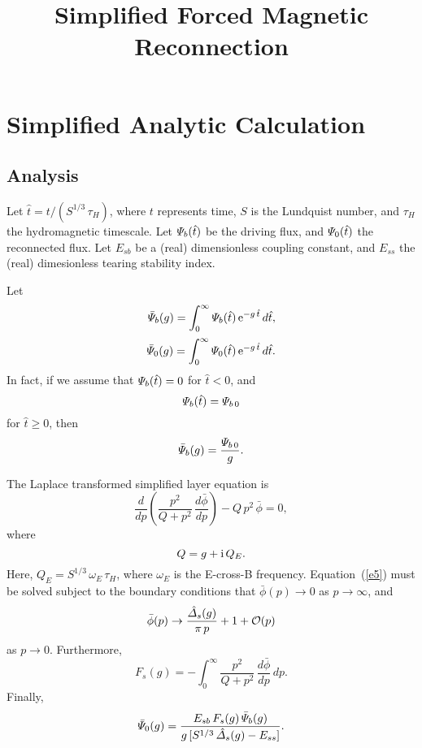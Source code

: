 \documentclass[titlepage=false,12pt]{article}
\begin{document}
\title{Simplified Forced Magnetic Reconnection}
\date{}
\maketitle

\section{Simplified Analytic Calculation}
\subsection{Analysis}
Let $\hat{t}= t/(S^{1/3}\,\tau_H)$, where $t$ represents time, $S$ is the Lundquist number, and $\tau_H$
the hydromagnetic timescale. Let ${\mit\Psi}_b(\hat{t})$ be the driving flux, and ${\mit\Psi}_0(\hat{t})$ the
reconnected flux. Let $E_{sb}$ be a (real) dimensionless coupling constant, and $E_{ss}$ the  (real) dimesionless
tearing stability index.

Let
\begin{align}
\bar{\mit\Psi}_b(g) = \int_0^\infty {\mit\Psi}_b(\hat{t})\,{\rm e}^{-g\,\hat{t}}\,d\hat{t},\\[0.5ex]
\bar{\mit\Psi}_0(g) = \int_0^\infty {\mit\Psi}_0(\hat{t})\,{\rm e}^{-g\,\hat{t}}\,d\hat{t}.
\end{align}
In fact, if we assume that ${\mit\Psi}_b(\hat{t})=0$ for $\hat{t}<0$, and
\begin{equation}
{\mit\Psi}_b(\hat{t}) = {\mit\Psi}_{b\,0}
\end{equation}
for $\hat{t}\geq 0$, then 
\begin{equation}
\bar{\mit\Psi}_b(g) = \frac{{\mit\Psi}_{b\,0}}{g}.
\end{equation}

The Laplace transformed simplified layer equation is
\begin{equation}\label{e5}
\frac{d}{dp}\!\left(\frac{p^2}{Q+p^2}\,\frac{d\bar{\phi}}{dp}\right) - Q\,p^2\,\bar{\phi}=0,
\end{equation}
where
\begin{equation}
Q = g+ {\rm i}\,Q_E.
\end{equation}
Here, $Q_E=S^{1/3}\,\omega_E\,\tau_H$, where $\omega_E$ is the E-cross-B frequency.
Equation~(\ref{e5}) must be solved subject to the boundary conditions that $\bar{\phi}(p)\rightarrow 0$ 
as $p\rightarrow \infty$, and
\begin{equation}
\bar{\phi}(p) \rightarrow \frac{\hat{\mit\Delta}_s(g)}{\pi\,p }+ 1 + {\cal O}(p)
\end{equation}
as $p\rightarrow 0$. 
Furthermore,
\begin{equation}
F_s(g) = - \int_0^\infty \frac{p^2}{Q+p^2}\,\frac{d\bar{\phi}}{dp}\,dp.
\end{equation}
Finally,
\begin{equation}
\bar{\mit\Psi}_0(g) = \frac{E_{sb}\,F_s(g)\,\bar{\mit\Psi}_b(g)}{g\,[S^{1/3}\,\hat{\mit\Delta}_s(g)-E_{ss}]}.
\end{equation}
\end{document}
